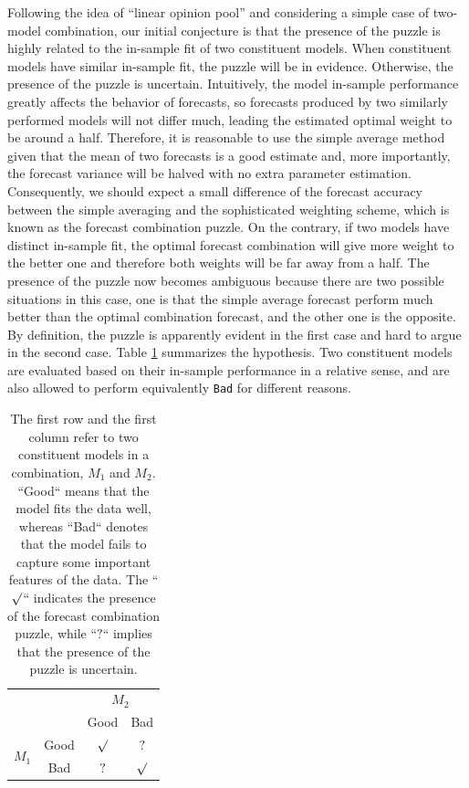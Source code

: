 \documentclass{monashthesis}
\begin{document}
Following the idea of ``linear opinion pool'' \autocite{HM07,GA11} and considering a simple case of two-model combination, our initial conjecture is that the presence of the puzzle is highly related to the in-sample fit of two constituent models. When constituent models have similar in-sample fit, the puzzle will be in evidence. Otherwise, the presence of the puzzle is uncertain. Intuitively, the model in-sample performance greatly affects the behavior of forecasts, so forecasts produced by two similarly performed models will not differ much, leading the estimated optimal weight to be around a half. Therefore, it is reasonable to use the simple average method given that the mean of two forecasts is a good estimate and, more importantly, the forecast variance will be halved with no extra parameter estimation. Consequently, we should expect a small difference of the forecast accuracy between the simple averaging and the sophisticated weighting scheme, which is known as the forecast combination puzzle. On the contrary, if two models have distinct in-sample fit, the optimal forecast combination will give more weight to the better one and therefore both weights will be far away from a half. The presence of the puzzle now becomes ambiguous because there are two possible situations in this case, one is that the simple average forecast perform much better than the optimal combination forecast, and the other one is the opposite. By definition, the puzzle is apparently evident in the first case and hard to argue in the second case. Table \ref{tab:1} summarizes the hypothesis. Two constituent models are evaluated based on their in-sample performance in a relative sense, and are also allowed to perform equivalently \texttt{Bad} for different reasons.

\begin{table}[ht]
\centering
\begin{tabular}{cccc}
                       &      & \multicolumn{2}{c}{$M_2$} \\
                       &      & Good       & Bad       \\
\multirow{2}{*}{$M_1$} & Good & $\surd$    & $?$ \\
                       & Bad  & $?$        & $\surd$
\end{tabular}
\caption{The first row and the first column refer to two constituent models in a combination, $M_1$ and $M_2$. ``Good`` means that the model fits the data well, whereas ``Bad`` denotes that the model fails to capture some important features of the data. The ``$\surd$`` indicates the presence of the forecast combination puzzle, while ``$?$`` implies that the presence of the puzzle is uncertain.}
\label{tab:1}
\end{table}
\end{document}
